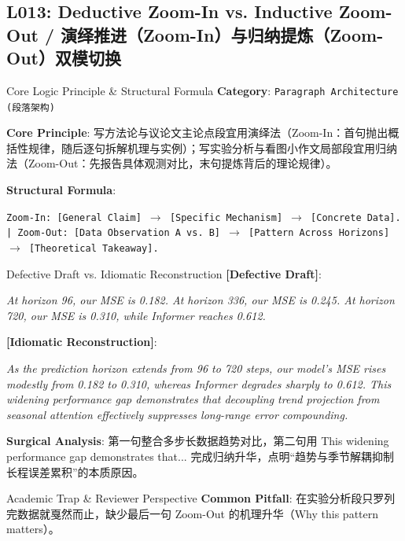 \subsection{L013: Deductive Zoom-In vs. Inductive Zoom-Out / 演绎推进（Zoom-In）与归纳提炼（Zoom-Out）双模切换}\label{sec:logic:L013}
\begin{ConceptBox}{Core Logic Principle \& Structural Formula}
\textbf{Category}: \texttt{Paragraph Architecture (段落架构)}\par\vspace{3pt}
\textbf{Core Principle}: 写方法论与议论文主论点段宜用演绎法（Zoom-In：首句抛出概括性规律，随后逐句拆解机理与实例）；写实验分析与看图小作文局部段宜用归纳法（Zoom-Out：先报告具体观测对比，末句提炼背后的理论规律）。\par\vspace{4pt}
\textbf{Structural Formula}:\par\noindent\texttt{Zoom-In: [General Claim] $\to$ [Specific Mechanism] $\to$ [Concrete Data]. | Zoom-Out: [Data Observation A vs. B] $\to$ [Pattern Across Horizons] $\to$ [Theoretical Takeaway].}
\end{ConceptBox}
\begin{ExampleBox}{Defective Draft vs. Idiomatic Reconstruction}
\textbf{\color{TargetHighlight}[Defective Draft]}:\par\textit{At horizon 96, our MSE is 0.182. At horizon 336, our MSE is 0.245. At horizon 720, our MSE is 0.310, while Informer reaches 0.612.}\par\vspace{4pt}
\textbf{\color{AcadNavy}[Idiomatic Reconstruction]}:\par\textit{As the prediction horizon extends from 96 to 720 steps, our model's MSE rises modestly from 0.182 to 0.310, whereas Informer degrades sharply to 0.612. This widening performance gap demonstrates that decoupling trend projection from seasonal attention effectively suppresses long-range error compounding.}\par\vspace{4pt}
\textbf{Surgical Analysis}: 第一句整合多步长数据趋势对比，第二句用 This widening performance gap demonstrates that... 完成归纳升华，点明“趋势与季节解耦抑制长程误差累积”的本质原因。
\end{ExampleBox}
\begin{TipBox}{Academic Trap \& Reviewer Perspective}
\textbf{Common Pitfall}: 在实验分析段只罗列完数据就戛然而止，缺少最后一句 Zoom-Out 的机理升华（Why this pattern matters）。
\end{TipBox}
\vspace{6pt}
